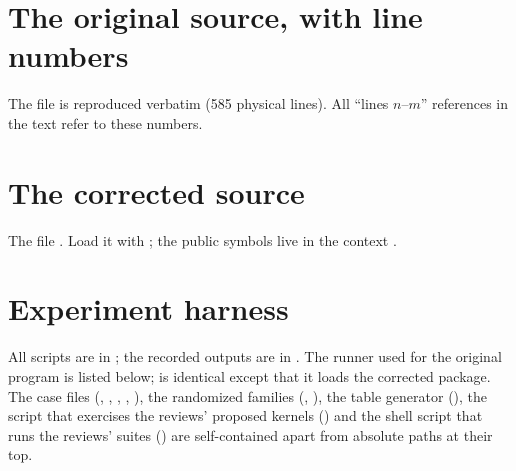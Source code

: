 \section{The original source, with line numbers}
\label{app:original}
The file  is reproduced verbatim (585 physical
lines). All ``lines $n$--$m$'' references in the text refer to these numbers.


\clearpage
\section{The corrected source}
\label{app:fixed}
The file . Load it with
; the public symbols live in the context
.


\clearpage
\section{Experiment harness}
\label{app:harness}
All scripts are in ; the recorded outputs are
in . The runner used for the original program is
listed below;  is identical except that it loads the
corrected package. The case files (,
, , ,
), the randomized families (,
), the table generator (), the
script that exercises the reviews' proposed kernels
() and the shell script that runs the reviews'
suites () are self-contained apart from absolute paths at
their top.


